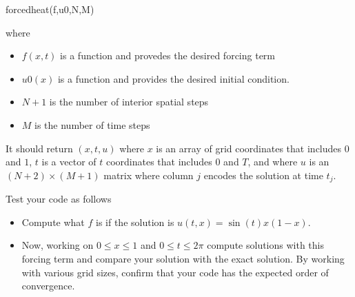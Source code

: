 \documentclass[minion]{homework}
\begin{document}
\begin{problems}
forcedheat(f,u0,N,M)

where 
\begin{itemize}
	\item $f(x,t)$ is a function and provedes the desired forcing term 
	\item $u0(x)$ is a function and provides the desired
initial condition. 
    \item $N+1$ is the number of interior spatial steps
    \item $M$ is the number of time steps
\end{itemize}
It should return $(x,t,u)$ where $x$ is an array of grid coordinates
that includes $0$ and $1$, $t$ is a vector of $t$ coordinates that includes
$0$ and $T$, and where $u$ is an $(N+2)\times(M+1)$ matrix where column
$j$ encodes the solution at time $t_j$.

Test your code as follows

\begin{itemize}  
\item Compute what $f$ is if the solution is $u(t,x)=\sin(t)x(1-x)$.  
\item Now, working on $0\le x\le 1$ and $0\le t\le 2\pi$ 
compute solutions with this forcing term and compare your solution
with the exact solution.  By working with various grid sizes,
confirm that your code has the expected order of convergence.
\end{itemize}

\end{problems}
\end{document}
